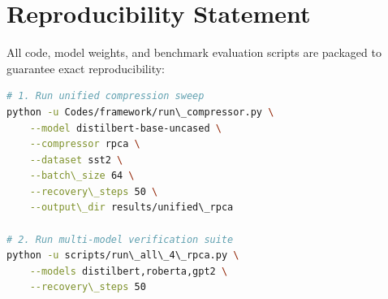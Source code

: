 \section{Reproducibility Statement}
All code, model weights, and benchmark evaluation scripts are packaged to guarantee exact reproducibility:
\begin{lstlisting}[language=bash]
# 1. Run unified compression sweep
python -u Codes/framework/run\_compressor.py \
    --model distilbert-base-uncased \
    --compressor rpca \
    --dataset sst2 \
    --batch\_size 64 \
    --recovery\_steps 50 \
    --output\_dir results/unified\_rpca

# 2. Run multi-model verification suite
python -u scripts/run\_all\_4\_rpca.py \
    --models distilbert,roberta,gpt2 \
    --recovery\_steps 50
\end{lstlisting}
